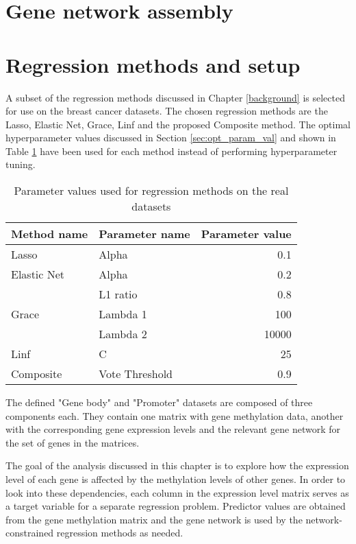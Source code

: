 \section{Gene network assembly} \label{sec_netwk}

\pagebreak
\section{Regression methods and setup}
A subset of the regression methods discussed in Chapter \ref{background} is selected for use on the breast cancer datasets. The chosen regression methods are the Lasso, Elastic Net, Grace, Linf and the proposed Composite method.
The optimal hyperparameter values discussed in Section \ref{sec:opt_param_val} and shown in Table \ref{tab:opt_param_val} have been used for each method instead of performing hyperparameter tuning.

{\def\arraystretch{1.5}\tabcolsep=10pt
	\begin{table}[H]
		\label{tab:opt_param_val}
		\caption{Parameter values used for regression methods on the real datasets}
		\centering
		\begin{tabular}{l l r}
			\hline\hline 
			Method name & Parameter name & Parameter value\\
			\hline\hline
			Lasso	&	Alpha	&	0.1\\
			\hline
			Elastic Net	&	Alpha	&	0.2\\
						&	L1 ratio&	0.8\\
			\hline
			Grace	&	Lambda 1	&	100\\
					&	Lambda 2	&	10000\\
			\hline
			Linf	&	C	&	25\\
			\hline
			Composite	&	Vote Threshold	&	0.9\\
			\hline
		\end{tabular}
	\end{table}
}

The defined "Gene body" and "Promoter" datasets are composed of three components each. They contain one matrix with gene methylation data, another with the corresponding gene expression levels and the relevant gene network for the set of genes in the matrices.

The goal of the analysis discussed in this chapter is to explore how the expression level of each gene is affected by the methylation levels of other genes. In order to look into these dependencies, each column in the expression level matrix serves as a target variable for a separate regression problem. Predictor values are obtained from the gene methylation matrix and the gene network is used by the network-constrained regression methods as needed.

